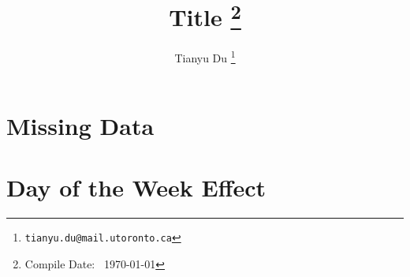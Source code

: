 \documentclass[12pt]{article}
\title{Title \footnote{Compile Date: \currenttime\ \today}}
\author{Tianyu Du \footnote{\texttt{tianyu.du@mail.utoronto.ca}}}
\begin{document}
	\maketitle
	\tableofcontents
	\newpage

	\section{Missing Data}
	\par
 
	\section{Day of the Week Effect}
	\par 
\end{document}
